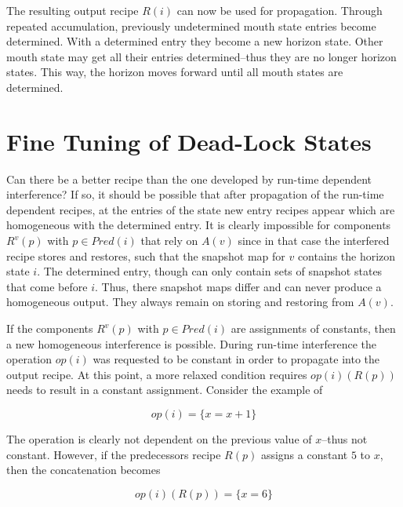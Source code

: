 \documentclass[12pt,a4paper]{scrartcl}
\begin{document}
The resulting output recipe $R(i)$ can now be used for propagation. Through
repeated accumulation, previously undetermined mouth state entries become
determined. With a determined entry they become a new horizon state. Other
mouth state may get all their entries determined--thus they are no longer
horizon states. This way, the horizon moves forward until all mouth states are
determined. 

%
\section{Fine Tuning of Dead-Lock States}

Can there be a better recipe than the one developed by run-time dependent
interference? If so, it should be possible that after propagation of the
run-time dependent recipes, at the entries of the state new entry recipes
appear which are homogeneous with the determined entry. It is clearly
impossible for components $R^v(p)$ with $p \in Pred(i)$ that rely on
$A(v)$ since in that case the interfered recipe stores and restores, such that
the snapshot map for $v$ contains the horizon state $i$. The determined entry,
though can only contain sets of snapshot states that come before $i$. Thus,
there snapshot maps differ and can never produce a homogeneous output. They
always remain on storing and restoring from $A(v)$.

If the components $R^v(p)$ with $p \in Pred(i)$ are assignments of
constants, then a new homogeneous interference is possible. During run-time
interference the operation $op(i)$ was requested to be constant in order to
propagate into the output recipe. At this point, a more relaxed condition
requires $op(i)(R(p))$ needs to result in a constant assignment. Consider the
example of 

\begin{equation}
                       op(i) = \{ x = x + 1 \}
\end{equation}

The operation is clearly not dependent on the previous value of $x$--thus not
constant. However, if the predecessors recipe $R(p)$ assigns a constant $5$ to
$x$, then the concatenation becomes

\begin{equation}
                       op(i)(R(p)) = \{ x = 6 \}
\end{equation}
\end{document}
